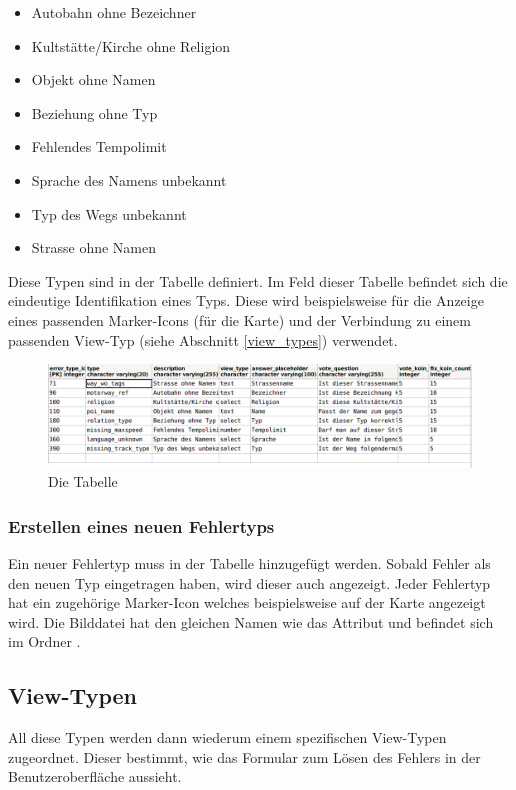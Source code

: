 \begin{itemize}
\item Autobahn ohne Bezeichner
\item Kultstätte/Kirche ohne Religion
\item Objekt ohne Namen
\item Beziehung ohne Typ
\item Fehlendes Tempolimit
\item Sprache des Namens unbekannt
\item Typ des Wegs unbekannt
\item Strasse ohne Namen
\end{itemize}

Diese Typen sind in der Tabelle  definiert.
Im Feld  dieser Tabelle befindet sich die eindeutige Identifikation eines Typs.
Diese wird beispielsweise für die Anzeige eines passenden Marker-Icons (für die Karte) und der Verbindung zu einem passenden View-Typ (siehe Abschnitt \ref{view_types}) verwendet.

\begin{figure}[H]
	\centering
	\includegraphics[scale=0.5]{images/backend/table-error-type}
	\caption{Die Tabelle }
\end{figure}

\subsubsection{Erstellen eines neuen Fehlertyps}
\label{create-new-error-type}
Ein neuer Fehlertyp muss in der Tabelle  hinzugefügt werden.
Sobald Fehler als  den neuen Typ eingetragen haben, wird dieser auch angezeigt.
Jeder Fehlertyp hat ein zugehörige Marker-Icon welches beispielsweise auf der Karte angezeigt wird.
Die Bilddatei hat den gleichen Namen wie das Attribut  und befindet sich im Ordner .

\subsection{View-Typen}
\label{view-types}
All diese Typen werden dann wiederum einem spezifischen View-Typen zugeordnet.
Dieser bestimmt, wie das Formular zum Lösen des Fehlers in der Benutzeroberfläche aussieht.

